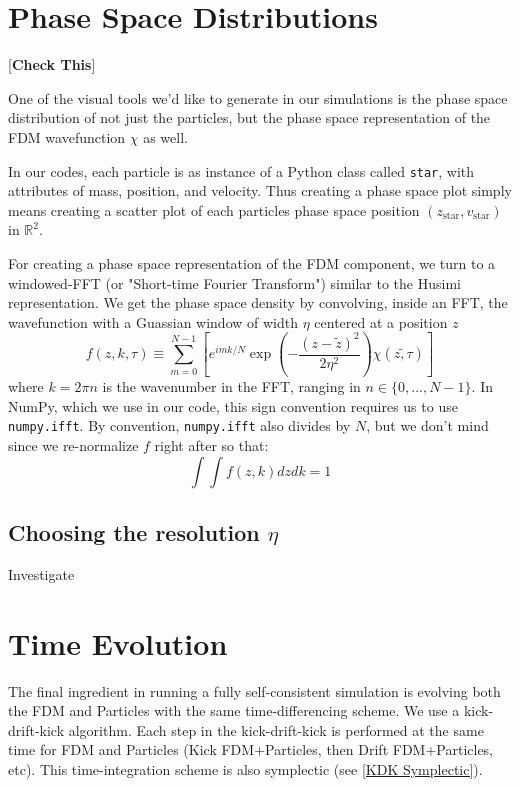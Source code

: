\documentclass[oneside]{book}
\begin{document}
\section{Phase Space Distributions}

{\color{red}
[\textbf{Check This}]}

One of the visual tools we'd like to generate in our simulations is the phase space distribution of not just the particles, but the phase space representation of the FDM wavefunction $\chi$ as well.

In our codes, each particle is as instance of a Python class called \texttt{star}, with attributes of mass, position, and velocity. Thus creating a phase space plot simply means creating a scatter plot of each particles phase space position $(z_\text{star},v_\text{star})$ in $\mathbb{R}^2$.

For creating a phase space representation of the FDM component, we turn to a windowed-FFT (or "Short-time Fourier Transform") similar to the Husimi representation. We get the phase space density by convolving, inside an FFT, the wavefunction with a Guassian window of width $\eta$ centered at a position $z$
\begin{equation}
    f(z,k,\tau) \equiv \sum_{m = 0}^{N-1} \left[e^{imk/N}\exp\left({-\frac{(z-\tilde{z})^2}{2\eta^2}}\right)\chi(\tilde{z,\tau})\right]
    \label{PhaseSpace FDM}
\end{equation}
where $k = 2\pi n$ is the wavenumber in the FFT, ranging in $n\in\{0,...,N-1\}$. In NumPy, which we use in our code, this sign convention requires us to use \texttt{numpy.ifft}. By convention, \texttt{numpy.ifft} also divides by $N$, but we don't mind since we re-normalize $f$ right after so that:
\begin{equation}
\int\int f(z,k) dzdk = 1
\end{equation}

\subsection{Choosing the resolution \(\eta\)}\label{Choosing Resolution}
{\color{red}Investigate}


\section{Time Evolution}

The final ingredient in running a fully self-consistent simulation is evolving both the FDM and Particles with the same time-differencing scheme. We use a kick-drift-kick algorithm. Each step in the kick-drift-kick is performed at the same time for FDM and Particles (Kick FDM+Particles, then Drift FDM+Particles, etc). This time-integration scheme is also symplectic (see \cref{KDK Symplectic}).
\end{document}

